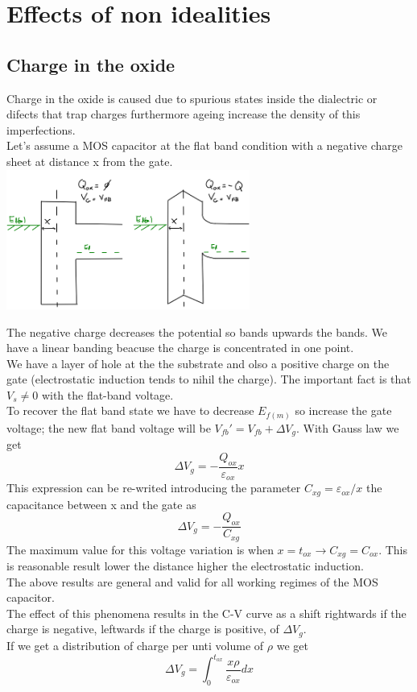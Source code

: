 \section{Effects of non idealities}

\subsection{Charge in the oxide}
Charge in the oxide is caused due to spurious states inside the dialectric or difects that trap charges furthermore ageing increase the density of this imperfections.\\
Let's assume a MOS capacitor at the flat band condition with a negative charge sheet at distance x from the gate.\\ 

\centering
\includegraphics[width=0.6\textwidth]{qinox.png}\\
\raggedright

The negative charge decreases the potential so bands upwards the bands. We have a linear banding beacuse the charge is concentrated in one point.\\
We have a layer of hole at the the substrate and olso a positive charge on the gate (electrostatic induction tends to nihil the charge). The important fact is that $V_s\neq0$ with the flat-band voltage.\\
To recover the flat band state we have to decrease $E_{f(m)}$ so increase the gate voltage; the new flat band voltage will be $V_{fb}'=V_{fb}+\Delta V_g$. With Gauss law we get
\begin{equation}
\Delta V_g=-\frac{Q_{ox}}{\varepsilon_{ox}}x
\end{equation}
This expression can be re-writed introducing the parameter $C_{xg}=\varepsilon_{ox}/x$ the capacitance between x and the gate as
\begin{equation}
\Delta V_g=-\frac{Q_{ox}}{C_{xg}}
\end{equation}
The maximum value for this voltage variation is when $x=t_{ox}\rightarrow C_{xg}=C_{ox}$. This is reasonable result lower the distance higher the electrostatic induction.\\
The above results are general and valid for all working regimes of the MOS capacitor.\\
The effect of this phenomena results in the C-V curve as a shift rightwards if the charge is negative, leftwards if the charge is positive, of $\Delta V_g$.\\
If we get a distribution of charge per unti volume of $\rho$ we get 
\begin{equation}
\Delta V_g=\int_0^{t_{ox}}\frac{x\rho}{\varepsilon_{ox}}dx
\end{equation}

